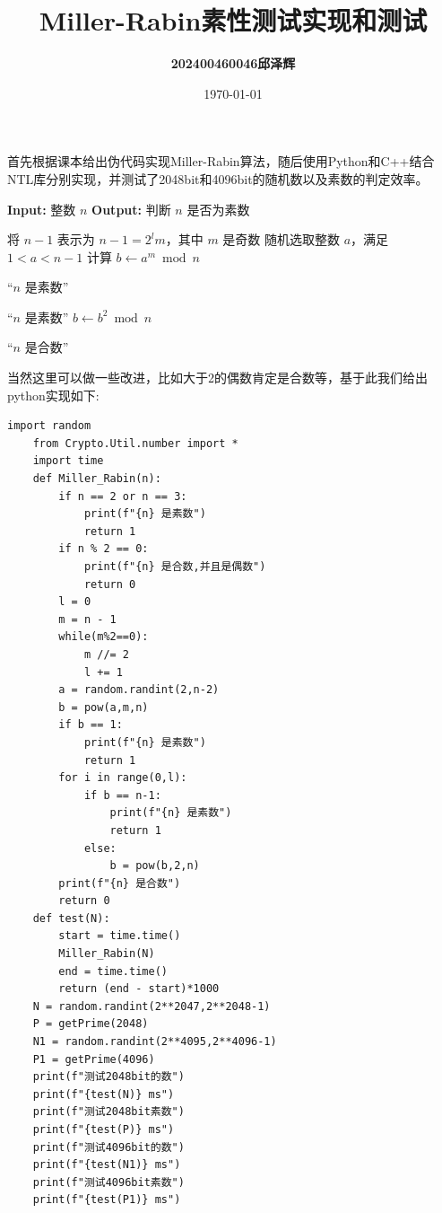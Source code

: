 \documentclass[12pt,a4paper]{article}
\title{
\textbf{\LARGE{Miller-Rabin素性测试实现和测试}}\\[0.5em]
}
\author{\textbf{202400460046邱泽辉}}
\date{\today}
\begin{document}
\maketitle
首先根据课本给出伪代码实现Miller-Rabin算法，随后使用Python和C++结合NTL库分别实现，并测试了2048bit和4096bit的随机数以及素数的判定效率。
\begin{algorithm}
\caption{Miller-Rabin 算法}
\begin{algorithmic}[1]
\STATE \textbf{Input:} 整数 $n$
\STATE \textbf{Output:} 判断 $n$ 是否为素数

\STATE 将 $n-1$ 表示为 $n-1 = 2^l m$，其中 $m$ 是奇数
\STATE 随机选取整数 $a$，满足 $1 < a < n-1$
\STATE 计算 $b \gets a^m \bmod n$

    \RETURN ``$n$ 是素数''
\ENDIF

        \RETURN ``$n$ 是素数''
    \ELSE
        \STATE $b \gets b^2 \bmod n$
    \ENDIF
\ENDFOR

\RETURN ``$n$ 是合数''
\end{algorithmic}
\end{algorithm}

当然这里可以做一些改进，比如大于2的偶数肯定是合数等，基于此我们给出python实现如下:
\begin{lstlisting}[style=mypython]
    import random
    from Crypto.Util.number import *
    import time
    def Miller_Rabin(n):
        if n == 2 or n == 3:
            print(f"{n} 是素数")
            return 1
        if n % 2 == 0:
            print(f"{n} 是合数,并且是偶数")
            return 0
        l = 0
        m = n - 1
        while(m%2==0):
            m //= 2
            l += 1
        a = random.randint(2,n-2)
        b = pow(a,m,n)
        if b == 1:
            print(f"{n} 是素数")
            return 1
        for i in range(0,l):
            if b == n-1:
                print(f"{n} 是素数")
                return 1
            else:
                b = pow(b,2,n)
        print(f"{n} 是合数")
        return 0
    def test(N):
        start = time.time()
        Miller_Rabin(N)
        end = time.time()
        return (end - start)*1000
    N = random.randint(2**2047,2**2048-1)
    P = getPrime(2048)
    N1 = random.randint(2**4095,2**4096-1)
    P1 = getPrime(4096)
    print(f"测试2048bit的数")
    print(f"{test(N)} ms")
    print(f"测试2048bit素数")
    print(f"{test(P)} ms")
    print(f"测试4096bit的数")
    print(f"{test(N1)} ms")
    print(f"测试4096bit素数")
    print(f"{test(P1)} ms")
\end{lstlisting}
\end{document}
